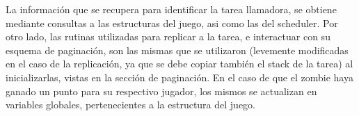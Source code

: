 \documentclass{article}
\begin{document}
    La información que se recupera para identificar la tarea llamadora, se obtiene mediante
    consultas a las estructuras del juego, asi como las del scheduler. Por otro lado, las rutinas
    utilizadas para replicar a la tarea, e interactuar con su esquema de paginación, son las mismas
    que se utilizaron (levemente modificadas en el caso de la replicación, ya que se debe copiar
    también el stack de la tarea) al inicializarlas, vistas en la sección de paginación. En el caso
    de que el zombie haya ganado un punto para su respectivo jugador, los mismos se actualizan en
    variables globales, pertenecientes a la estructura del juego.
\end{document}
